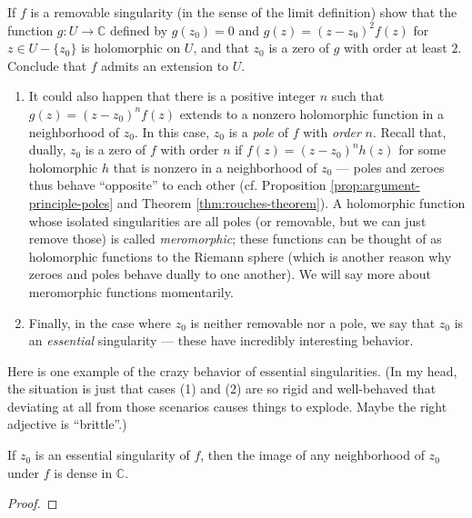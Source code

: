\documentclass[10pt]{article}
\providecommand{\CC}{\mathbb C}
\providecommand{\ii}{\item}
\providecommand{\vocab}[1]{{{\sffamily\textit{#1}}}}
\begin{document}
\begin{exercise}
    If $f$ is a removable singularity
    (in the sense of the limit definition)
    show that the function $g\colon U\to\CC$ defined by
    $g(z_0) = 0$ and $g(z) = (z-z_0)^2f(z)$ for $z\in U-\{z_0\}$
    is holomorphic on $U$, and that $z_0$
    is a zero of $g$ with order at least $2$.
    Conclude that $f$ admits an extension to $U$.
\end{exercise}

\begin{enumerate}[(1),resume]
    \ii It could also happen that there is a positive integer $n$
    such that $g(z) = (z-z_0)^nf(z)$ extends to a
    nonzero holomorphic function in a neighborhood of $z_0$.
    In this case, $z_0$ is a \vocab{pole} of $f$
    with \vocab{order} $n$. Recall that, dually, $z_0$ is a zero
    of $f$ with order $n$ if $f(z) = (z-z_0)^nh(z)$ for some
    holomorphic $h$ that is nonzero in a neighborhood of $z_0$ ---
    poles and zeroes thus behave ``opposite'' to each other
    (cf. Proposition \ref{prop:argument-principle-poles}
    and Theorem \ref{thm:rouches-theorem}).
    A holomorphic function whose isolated singularities are all poles
    (or removable, but we can just remove those)
    is called \vocab{meromorphic};
    these functions can be thought of as holomorphic functions
    to the Riemann sphere (which is another reason why
    zeroes and poles behave dually to one another).
    We will say more about meromorphic functions momentarily.

    \ii Finally, in the case where $ z_0$
    is neither removable nor a pole, we say that $z_0$ is
    an \vocab{essential} singularity ---
    these have incredibly interesting behavior.
\end{enumerate}

Here is one example of the crazy behavior of essential singularities.
(In my head, the situation is just that
cases (1) and (2) are so rigid and well-behaved
that deviating at all from those scenarios
causes things to explode. Maybe the right adjective is ``brittle''.)
\begin{prop}
    \label{prop:essential-singularity-density}
    If $z_0$ is an essential singularity of $f$,
    then the image of any neighborhood of $z_0$ under $f$
    is dense in $\CC$.
\end{prop}

\begin{proof}
\end{proof}
\end{document}
